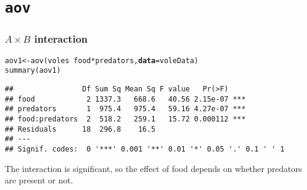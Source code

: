 \documentclass[color=usenames,dvipsnames]{beamer}\usepackage[]{graphicx}\usepackage[]{color}
\makeatletter
\newcommand{\hlopt}[1]{\textcolor[rgb]{0,0,0}{#1}}%
\newcommand{\hlstd}[1]{\textcolor[rgb]{0,0,0}{#1}}%
\newcommand{\hlkwb}[1]{\textcolor[rgb]{0,0.341,0.682}{#1}}%
\newcommand{\hlkwc}[1]{\textcolor[rgb]{0,0,0}{\textbf{#1}}}%
\newcommand{\hlkwd}[1]{\textcolor[rgb]{0.004,0.004,0.506}{#1}}%
\newenvironment{kframe}{%
 \def\at@end@of@kframe{}%
 \ifinner\ifhmode%
  \def\at@end@of@kframe{\end{minipage}}%
  \begin{minipage}{\columnwidth}%
 \fi\fi%
 \def\FrameCommand##1{\hskip\@totalleftmargin \hskip-\fboxsep
 \colorbox{shadecolor}{##1}\hskip-\fboxsep
     \hskip-\linewidth \hskip-\@totalleftmargin \hskip\columnwidth}%
 \MakeFramed {\advance\hsize-\width
   \@totalleftmargin\z@ \linewidth\hsize
   \@setminipage}}%
 {\par\unskip\endMakeFramed%
 \at@end@of@kframe}
\newenvironment{knitrout}{}{} %
\makeatother
\begin{document}
\section{\tt aov}




\begin{frame}[fragile]
  \frametitle{$A \times B$ interaction}
  \small
\begin{knitrout}
\color{fgcolor}\begin{kframe}
\begin{alltt}
\hlstd{aov1} \hlkwb{<-} \hlkwd{aov}\hlstd{(voles} \hlopt{~} \hlstd{food} \hlopt{*} \hlstd{predators,} \hlkwc{data}\hlstd{=voleData)}
\hlkwd{summary}\hlstd{(aov1)}
\end{alltt}
\begin{verbatim}
##                Df Sum Sq Mean Sq F value   Pr(>F)    
## food            2 1337.3   668.6   40.56 2.15e-07 ***
## predators       1  975.4   975.4   59.16 4.27e-07 ***
## food:predators  2  518.2   259.1   15.72 0.000112 ***
## Residuals      18  296.8    16.5                     
## ---
## Signif. codes:  0 '***' 0.001 '**' 0.01 '*' 0.05 '.' 0.1 ' ' 1
\end{verbatim}
\end{kframe}
\end{knitrout}
\pause
\vfill
The interaction is significant, so the effect of food depends on
whether predators are present or not. %
\end{frame}




\end{document}
